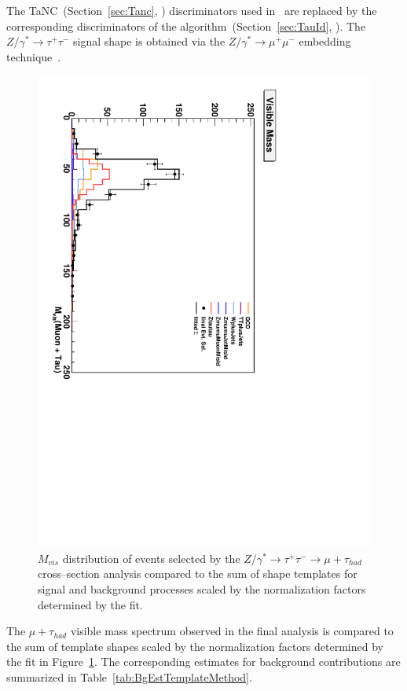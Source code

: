 The TaNC~(Section~\ref{sec:Tanc}, \cite{CMS_AN_2010-099}) discriminators used
in~\cite{CMS_AN_2011-021} are replaced by the corresponding discriminators of
the \hpsTanc algorithm~(Section~\ref{sec:TauId}, \cite{CMS_AN_2010-082}).  The
$Z/\gamma^{*} \to \tau^{+} \tau^{-}$ signal shape is obtained via the
$Z/\gamma^{*} \to \mu^{+} \mu^{-}$ embedding technique~\cite{MCEmbedding}.
\begin{figure}
\setlength{\unitlength}{1mm}
\begin{center}
\includegraphics*[height=0.85\textwidth, angle=90, viewport=0 0 375
540]{backgrounds_chapter/figures/fitBgEstTemplateZtoMuTau_visMass.pdf}
\caption[Visible mass distribution in the final fit of the Template
Method]{\captiontext $M_{vis}$ distribution of events selected by the
\mbox{$Z/\gamma^{*} \rightarrow \tau^{+} \tau^{-} \rightarrow \mu + \tau_{had}$}
cross--section analysis compared to the sum of shape templates for signal and
background processes scaled by the normalization factors determined by the fit.}
\label{fig:TemplateFitControlPlot}
\end{center}
\end{figure} 
The $\mu + \tau_{had}$ visible mass spectrum observed in the final analysis is
compared to the sum of template shapes scaled by the normalization factors
determined by the fit in Figure~\ref{fig:TemplateFitControlPlot}.  The
corresponding estimates for background contributions are summarized in
Table~\ref{tab:BgEstTemplateMethod}.

